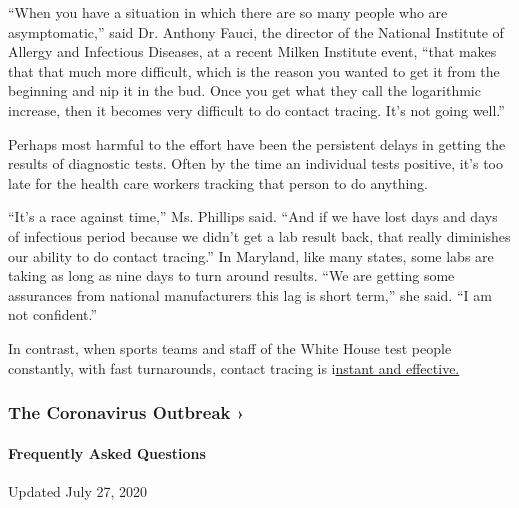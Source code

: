 ``When you have a situation in which there are so many people who are
asymptomatic,'' said Dr. Anthony Fauci, the director of the National
Institute of Allergy and Infectious Diseases, at a recent Milken
Institute event, ``that makes that that much more difficult, which is
the reason you wanted to get it from the beginning and nip it in the
bud. Once you get what they call the logarithmic increase, then it
becomes very difficult to do contact tracing. It's not going well.''

Perhaps most harmful to the effort have been the persistent delays in
getting the results of diagnostic tests. Often by the time an individual
tests positive, it's too late for the health care workers tracking that
person to do anything.

``It's a race against time,'' Ms. Phillips said. ``And if we have lost
days and days of infectious period because we didn't get a lab result
back, that really diminishes our ability to do contact tracing.'' In
Maryland, like many states, some labs are taking as long as nine days to
turn around results. ``We are getting some assurances from national
manufacturers this lag is short term,'' she said. ``I am not
confident.''

In contrast, when sports teams and staff of the White House test people
constantly, with fast turnarounds, contact tracing is
i\href{https://www.nbcnews.com/politics/white-house/white-house-executive-office-cafeteria-closed-after-positive-coronavirus-test-n1234662?cid=sm_npd_nn_tw_ma}{nstant
and effective.}

\href{https://www.nytimes.com/news-event/coronavirus?action=click\&pgtype=Article\&state=default\&region=MAIN_CONTENT_3\&context=storylines_faq}{}

\hypertarget{the-coronavirus-outbreak-}{%
\subsubsection{The Coronavirus Outbreak
›}\label{the-coronavirus-outbreak-}}

\hypertarget{frequently-asked-questions}{%
\paragraph{Frequently Asked
Questions}\label{frequently-asked-questions}}

Updated July 27, 2020

